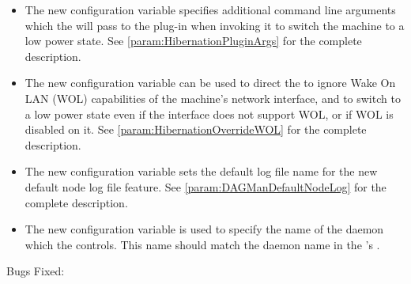 \begin{itemize}
\item The new configuration variable 
  specifies additional command line arguments which the
   will pass to the plug-in when invoking it to
  switch the machine to a low power state.
  See \ref{param:HibernationPluginArgs} for the complete description.

\item The new configuration variable  can be
  used to direct the  to ignore Wake On LAN (WOL)
  capabilities of the machine's network interface, and to switch to a
  low power state even if the interface does not support WOL, or if
  WOL is disabled on it.
  See \ref{param:HibernationOverrideWOL} for the complete description.

\item The new configuration variable  sets
the default log file name for the new 
default node log file feature.
See \ref{param:DAGManDefaultNodeLog}
for the complete description.

\item The new configuration variable  is used
  to specify the name of the daemon which the  controls.
  This name should match the daemon name in the 's
  .

\end{itemize}

\noindent Bugs Fixed:

